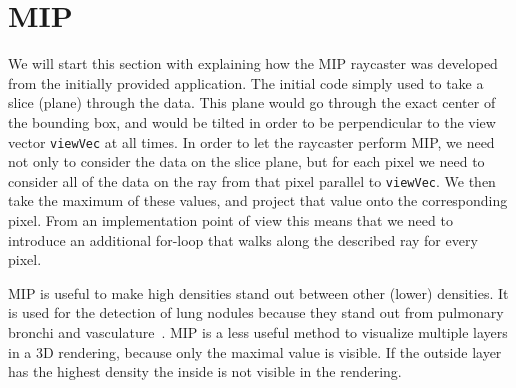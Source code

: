
\section{MIP}\label{sec:mip}
We will start this section with explaining how the MIP raycaster was developed from the initially provided application. The initial code simply used to take a slice (plane) through the data. This plane would go through the exact center of the bounding box, and would be tilted in order to be perpendicular to the view vector \texttt{viewVec} at all times. In order to let the raycaster perform MIP, we need not only to consider the data on the slice plane, but for each pixel we need to consider all of the data on the ray from that pixel parallel to \texttt{viewVec}. We then take the maximum of these values, and project that value onto the corresponding pixel. From an implementation point of view this means that we need to introduce an additional for-loop that walks along the described ray for every pixel.

MIP is useful to make high densities stand out between other (lower) densities.
It is used for the detection of lung nodules because they stand out from pulmonary bronchi and vasculature~\cite{wikiMIP}.
MIP is a less useful method to visualize multiple layers in a 3D rendering, because only the maximal value is visible.
If the outside layer has the highest density the inside is not visible in the rendering.

